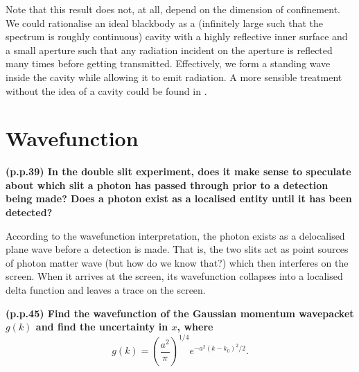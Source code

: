 \documentclass{article}
\begin{document}
Note that this result does not, at all, depend on the dimension of confinement. We could rationalise an ideal blackbody as a (infinitely large such that the spectrum is roughly continuous) cavity with a highly reflective inner surface and a small aperture such that any radiation incident on the aperture is reflected many times before getting transmitted. Effectively, we form a standing wave inside the cavity while allowing it to emit radiation. A more sensible treatment without the idea of a cavity could be found in \cite{Smerlak_2011}.

\section{Wavefunction}
\begin{framed}
    \textbf{(p.p.39) In the double slit experiment, does it make sense to speculate about which slit a photon has passed through prior to a detection being made? Does a photon exist as a localised entity until it has been detected?} 
\end{framed}


According to the wavefunction interpretation, the photon exists as a delocalised plane wave before a detection is made. That is, the two slits act as point sources of photon matter wave (but how do we know that?) which then interferes on the screen. When it arrives at the screen, its wavefunction collapses into a localised delta function and leaves a trace on the screen. 
\begin{framed}
    \textbf{(p.p.45) Find the wavefunction of the Gaussian momentum wavepacket $g(k)$ and find the uncertainty in $x$, where }
\[
    g(k) = \left( \frac{a^{2} }{\pi }\right)^{1 /4} e^{-a^{2} (k-k_0)^{2} /2}. 
\]
\end{framed}
\end{document}

